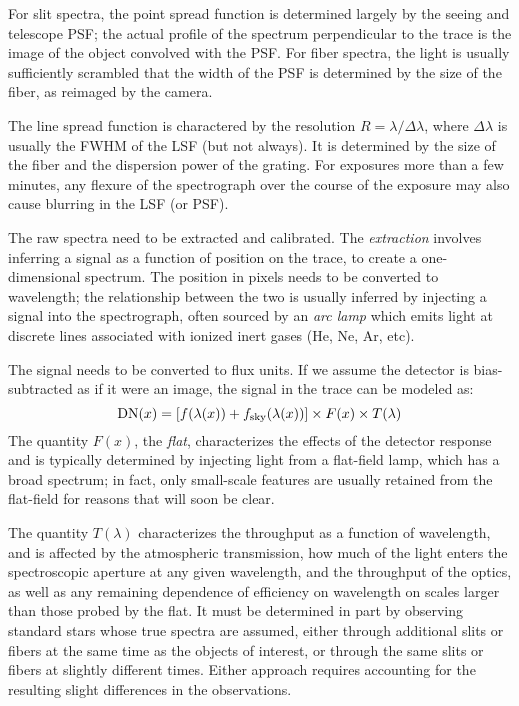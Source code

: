 For slit spectra, the point spread function is determined largely by
the seeing and telescope PSF; the actual profile of the spectrum
perpendicular to the trace is the image of the object convolved with
the PSF. For fiber spectra, the light is usually sufficiently
scrambled that the width of the PSF is determined by the size of the
fiber, as reimaged by the camera.

The line spread function is charactered by the resolution $R= \lambda
/ \Delta \lambda$, where $\Delta\lambda$ is usually the FWHM of the
LSF (but not always). It is determined by the size of the fiber and
the dispersion power of the grating. For exposures more than a few
minutes, any flexure of the spectrograph over the course of the
exposure may also cause blurring in the LSF (or PSF).

The raw spectra need to be extracted and calibrated. The {\it
extraction} involves inferring a signal as a function of position on
the trace, to create a one-dimensional spectrum. The position in
pixels needs to be converted to wavelength; the relationship between
the two is usually inferred by injecting a signal into the
spectrograph, often sourced by an {\it arc lamp} which emits light at
discrete lines associated with ionized inert gases (He, Ne, Ar,
etc).

The signal needs to be converted to flux units. If we assume the
detector is bias-subtracted as if it were an image, the signal in the
trace can be modeled as:
\begin{equation}
{\rm DN}(x) = \left[f(\lambda(x)) + f_{\rm
sky}(\lambda(x))\right] \times F(x) \times T(\lambda)
\end{equation}
The quantity $F(x)$, the {\it flat}, characterizes the effects of the
detector response and is typically determined by injecting light from
a flat-field lamp, which has a broad spectrum; in fact, only
small-scale features are usually retained from the flat-field for
reasons that will soon be clear.

The quantity $T(\lambda)$ characterizes the throughput as a function
of wavelength, and is affected by the atmospheric transmission, how
much of the light enters the spectroscopic aperture at any given
wavelength, and the throughput of the optics, as well as any remaining
dependence of efficiency on wavelength on scales larger than those
probed by the flat. It must be determined in part by observing
standard stars whose true spectra are assumed, either through
additional slits or fibers at the same time as the objects of
interest, or through the same slits or fibers at slightly different
times. Either approach requires accounting for the resulting slight
differences in the observations. 

